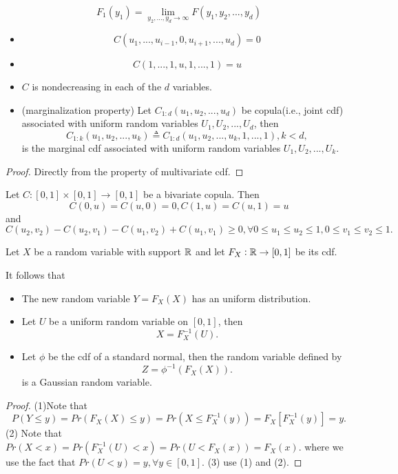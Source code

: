\begin{refsection}
\begin{note}
	
	$$F_1(y_1) = \lim_{y_2,...,y_d\to \infty} F(y_1,y_2,...,y_d)$$
\end{note}

\begin{lemma}\label{ch:statistical-models:th:basicpropertiesofcopulas}\hfill
\begin{itemize}
	\item 	$$C(u_1,...,u_{i-1},0,u_{i+1},...,u_d) = 0$$
	\item $$C(1,...,1,u,1,...,1) = u$$
	\item $C$ is nondecreasing in each of the $d$ variables.
	\item (marginalization property) Let $C_{1:d}(u_1,u_2,...,u_d)$ be copula(i.e., joint cdf) associated with uniform random variables $U_1,U_2,...,U_d$, then 
	$$C_{1:k}(u_1,u_2,...,u_k) \triangleq C_{1:d}(u_1,u_2,...,u_k,1,...,1),k < d,$$
	is the marginal cdf associated with uniform random variables $U_1,U_2,...,U_k$.
\end{itemize}
\end{lemma}
\begin{proof}
Directly from the property of multivariate cdf.
\end{proof}

\begin{corollary}
	Let $C:[0,1]\times[0,1]\to [0,1]$ be a bivariate copula. Then
	$$C(0,u) = C(u,0) = 0, C(1,u) = C(u,1) = u$$
	and
	$$C(u_2,v_2) - C(u_2,v_1) - C(u_1,v_2) + C(u_1,v_1)\geq 0,\forall 0\leq u_1\leq u_2 \leq 1, 0\leq v_1\leq v_2\leq 1.$$
\end{corollary}

\begin{lemma}\label{ch:statistical-models:th:probabilityintegraltransform}
Let $X$ be a random variable with support $\mathbb{R}$ and let $F_X: \mathbb{R}\to [0,1]$ be its cdf. 

It follows that
\begin{itemize}
	\item The new random variable $Y = F_X(X)$ has an uniform distribution.
	\item Let $U$ be a uniform random variable on $[0,1]$, then
	$$X = F^{-1}_X(U).$$   
	\item Let $\phi$ be the cdf of a standard normal, then the random variable defined by
	$$Z = \phi^{-1}(F_X(X)).$$
	is a Gaussian random variable.
\end{itemize} 
\end{lemma}
\begin{proof}
(1)Note that
$$P(Y\leq y) = Pr(F_X(X) \leq y) = Pr(X \leq F_X^{-1}(y)) = F_X[F_X^{-1}(y)] = y.$$
(2) Note that
$Pr(X < x) = Pr(F^{-1}_X(U) < x) = Pr(U < F_X(x)) = F_X(x).$
where we use the fact that $Pr(U < y) = y, \forall y\in [0,1]$.
(3) use (1) and (2).
\end{proof}





\end{refsection}
